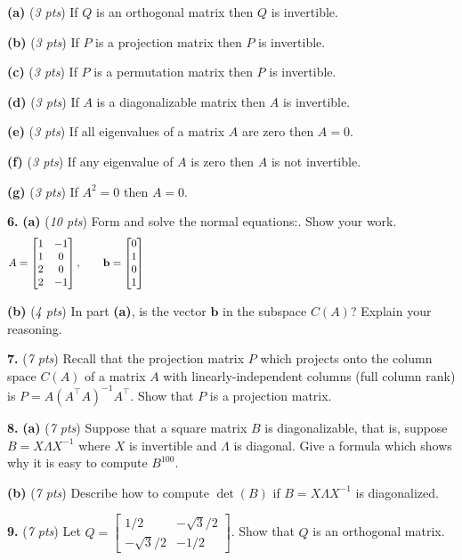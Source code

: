 \documentclass[11pt]{amsart}
\newcommand{\bb}{\mathbf{b}}
\newcommand{\ds}{\displaystyle}
\newcommand{\prob}[1]{\bigskip\noindent\textbf{#1.} }
\newcommand{\pts}[1]{(\emph{#1 pts})}
\newcommand{\probpts}[2]{\prob{#1} \pts{#2} \quad}
\newcommand{\ppartpts}[2]{\textbf{(#1)} \pts{#2} \quad}
\newcommand{\epartpts}[2]{\medskip\noindent \textbf{(#1)} \pts{#2} \quad}
\begin{document}
\epartpts{a}{3}  If $Q$ is an orthogonal matrix then $Q$ is invertible.
\vfill

\epartpts{b}{3}  If $P$ is a projection matrix then $P$ is invertible.
\vfill

\epartpts{c}{3}  If $P$ is a permutation matrix then $P$ is invertible.
\vfill

\epartpts{d}{3}  If $A$ is a diagonalizable matrix then $A$ is invertible.
\vfill

\epartpts{e}{3}  If all eigenvalues of a matrix $A$ are zero then $A=0$.
\vfill

\epartpts{f}{3}  If any eigenvalue of $A$ is zero then $A$ is not invertible.
\vfill

\epartpts{g}{3}  If $A^2=0$ then $A=0$.
\vfill


\clearpage \newpage
\prob{6} \ppartpts{a}{10}  Form and solve the normal equations:.  Show your work.
    $$A = \begin{bmatrix} 1 & -1 \\ 1 & 0 \\ 2 & 0 \\ 2 & -1 \end{bmatrix}, \qquad \bb = \begin{bmatrix} 0 \\ 1 \\ 0 \\ 1 \end{bmatrix} \hspace{4.0in}$$
\vfill

\epartpts{b}{4}  In part \textbf{(a)}, is the vector $\bb$ in the subspace $C(A)$?  Explain your reasoning.
\vspace{2.0in}


\clearpage \newpage
\probpts{7}{7}  Recall that the projection matrix $P$ which projects onto the column space $C(A)$ of a matrix $A$ with linearly-independent columns (full column rank) is $P=A (A^\top A)^{-1} A^\top$.  Show that $P$ is a projection matrix.
\vfill

\prob{8} \ppartpts{a}{7}  Suppose that a square matrix $B$ is diagonalizable, that is, suppose $B = X \Lambda X^{-1}$ where $X$ is invertible and $\Lambda$ is diagonal.   Give a formula which shows why it is easy to compute $B^{100}$.
\vfill

\epartpts{b}{7}  Describe how to compute $\det(B)$ if $B = X \Lambda X^{-1}$ is diagonalized.
\vfill


\clearpage \newpage
\probpts{9}{7}  Let $\ds Q = \begin{bmatrix} 1/2 & -\sqrt{3}/2 \\ -\sqrt{3}/2 & -1/2 \end{bmatrix}$.  Show that $Q$ is an orthogonal matrix.
\vfill
\end{document}
